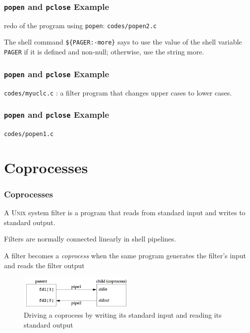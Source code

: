 \documentclass[newPxFont,sthlmFooter,nooffset]{beamer}
\begin{document}
\begin{frame}
  \frametitle{\texttt{popen} and \texttt{pclose} Example}
redo of the program using \texttt{popen}: \texttt{codes/popen2.c}

The shell command \texttt{\$\{PAGER:-more\}} says to use the value of the shell variable
\texttt{PAGER} if it is defined and non-null; otherwise, use the string more.

  
\end{frame}



\begin{frame}[t, fragile]
  \frametitle{\texttt{popen} and \texttt{pclose} Example}
\texttt{codes/myuclc.c} : a filter program that changes upper cases to lower cases.

  
\end{frame}



\begin{frame}
  \frametitle{\texttt{popen} and \texttt{pclose} Example}
\texttt{codes/popen1.c}

  
\end{frame}



\section{Coprocesses}

\begin{frame}[t]
  \frametitle{Coprocesses}
A \textsc{Unix} system filter is a program that reads from standard input and writes to standard output. 

Filters are normally connected linearly in shell pipelines.

A filter becomes a \textit{coprocess} when the same program generates the filter's input and reads the filter output

  \begin{figure}[h]
    \centering
    \includegraphics[width=0.5\textwidth]{./figures/fig15_16-driving.png}
    \caption{Driving a coprocess by writing its standard input and reading its standard output}
  \end{figure}


\end{frame}
\end{document}
